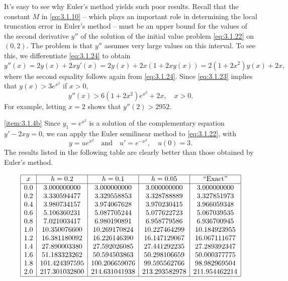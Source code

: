 \documentclass{ximera}
\begin{document}
\begin{example}
\begin{explanation}
It's easy to see why Euler's method yields such poor results.
Recall that the constant $M$ in
\eqref{eq:3.1.10} -- which plays an important role in determining the
local truncation error in Euler's method -- must be an upper bound for
the values of the second derivative $y''$ of the solution of the
initial
value problem \eqref{eq:3.1.22} on $(0,2)$. The problem is that $y''$
assumes very large values on this interval. To see this, we
differentiate \eqref{eq:3.1.24} to obtain
$$
y''(x)=2y(x)+2xy'(x)=2y(x)+2x(1+2xy(x))=2(1+2x^2)y(x)+2x,
$$
where the second equality follows again from \eqref{eq:3.1.24}.
Since \eqref{eq:3.1.23} implies that $y(x)>3e^{x^2}$ if $x>0$,
$$
y''(x)>6(1+2x^2)e^{x^2}+2x,\quad x>0.
$$
For example, letting $x=2$ shows that $y''(2)>2952$.

\ref{item:3.1.4b}
Since $y_1=e^{x^2}$ is a solution of the complementary equation
$y'-2xy=0$, we can  apply the Euler semilinear method to
\eqref{eq:3.1.22}, with
$$
y=ue^{x^2}\quad\mbox{and}\quad
u'=e^{-x^2},\quad u(0)=3.
$$
The results listed in the following table are clearly better than
those obtained by Euler's method.

$$
\begin{array}{|c|c|c|c|c|}
\hline
x&
h=0.2&
h=0.1&
h=0.05&
\text{``Exact''}\\ \hline
0.0 &  3.000000000  &   3.000000000 &   3.000000000 &   3.000000000 \\
0.2 &  3.330594477  &   3.329558853 &   3.328788889 &   3.327851973 \\
0.4 &  3.980734157  &   3.974067628 &   3.970230415 &   3.966059348 \\
0.6 &  5.106360231  &   5.087705244 &   5.077622723 &   5.067039535 \\
0.8 &  7.021003417  &   6.980190891 &   6.958779586 &   6.936700945 \\
1.0 & 10.350076600  &  10.269170824 &  10.227464299 &  10.184923955 \\
1.2 & 16.381180092  &  16.226146390 &  16.147129067 &  16.067111677 \\
1.4 & 27.890003380  &  27.592026085 &  27.441292235 &  27.289392347 \\
1.6 & 51.183323262  &  50.594503863 &  50.298106659 &  50.000377775 \\
1.8 &101.424397595  & 100.206659076 &  99.595562766 &  98.982969504 \\
2.0 &217.301032800  & 214.631041938 & 213.293582978 & 211.954462214\\
\hline
\end{array}
$$
\end{explanation}
\end{example}
\end{document}
